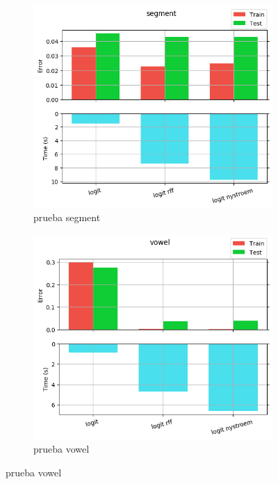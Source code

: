 \begin{figure}[ht]
  \centering
  \begin{subfigure}[b]{0.5\linewidth}
    \centering\includegraphics[width=\imgscale\linewidth]{Figures/2_1/segment}
    \caption{prueba segment}
    \label{fig:2_1_segment}
  \end{subfigure}%
  \begin{subfigure}[b]{0.5\linewidth}
    \centering\includegraphics[width=\imgscale\linewidth]{Figures/2_1/vowel}
    \caption{prueba vowel}
    \label{fig:2_1_vowel}
  \end{subfigure}
\end{figure}
